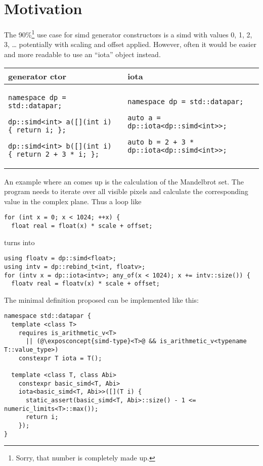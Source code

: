 \section{Motivation}
The 90\%\footnote{Sorry, that number is completely made up.} use case for simd
generator constructors is a simd with values 0, 1, 2, 3, \ldots{} potentially
with scaling and offset applied.
However, often it would be easier and more readable to use an “iota”
 object instead.

\begingroup
  \smaller[1]
\begin{tabular}{p{}|p{}}
  generator ctor & iota \\
  \hline
  \begin{lstlisting}
namespace dp = std::datapar;

dp::simd<int> a([](int i) { return i; };

dp::simd<int> b([](int i) { return 2 + 3 * i; };
  \end{lstlisting}
  &
  \begin{lstlisting}
namespace dp = std::datapar;

auto a = dp::iota<dp::simd<int>>;

auto b = 2 + 3 * dp::iota<dp::simd<int>>;
  \end{lstlisting}
\end{tabular}
\endgroup

\pagebreak
An example where an  comes up is the calculation of the
Mandelbrot set.
The program needs to iterate over all visible pixels and calculate the
corresponding value in the complex plane.
Thus a loop like
\medskip\begin{lstlisting}[style=Vc]
for (int x = 0; x < 1024; ++x) {
  float real = float(x) * scale + offset;
\end{lstlisting}
turns into
\medskip\begin{lstlisting}[style=Vc]
using floatv = dp::simd<float>;
using intv = dp::rebind_t<int, floatv>;
for (intv x = dp::iota<intv>; any_of(x < 1024); x += intv::size()) {
  floatv real = floatv(x) * scale + offset;
\end{lstlisting}

The minimal definition proposed can be implemented like this:
\medskip\begin{lstlisting}[style=Vc]
namespace std::datapar {
  template <class T>
    requires is_arithmetic_v<T>
      || (@\exposconcept{simd-type}<T>@ && is_arithmetic_v<typename T::value_type>)
    constexpr T iota = T();

  template <class T, class Abi>
    constexpr basic_simd<T, Abi>
    iota<basic_simd<T, Abi>>([](T i) {
      static_assert(basic_simd<T, Abi>::size() - 1 <= numeric_limits<T>::max());
      return i;
    });
}
\end{lstlisting}
